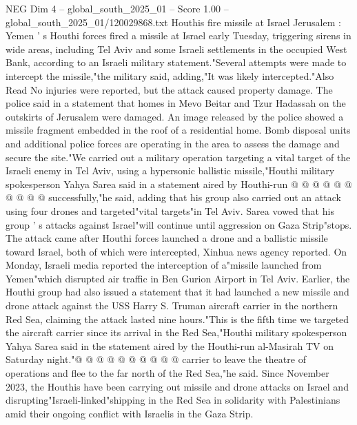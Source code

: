 \begin{textsample}{NEG Dim 4 – global\_south\_2025\_01 – Score 1.00 – global\_south\_2025\_01/120029868.txt}  \label{ex:f4_neg_446}
Houthis fire missile at Israel Jerusalem : Yemen ' s Houthi forces fired a missile at Israel early Tuesday, triggering sirens in wide areas, including Tel Aviv and some Israeli settlements in the occupied West Bank, according to an Israeli military statement."Several attempts were made to intercept the missile,"the military said, adding,"It was likely intercepted."Also Read No injuries were reported, but the attack caused property damage.
The police said in a statement that homes in Mevo Beitar and Tzur Hadassah on the outskirts of Jerusalem were damaged.
An image released by the police showed a missile fragment embedded in the roof of a residential home.
Bomb disposal units and additional police forces are operating in the area to assess the damage and secure the site."We carried out a military operation targeting a vital target of the Israeli enemy in Tel Aviv, using a hypersonic ballistic missile,"Houthi military spokesperson Yahya Sarea said in a statement aired by Houthi-run @ @ @ @ @ @ @ @ @ @ successfully,"he said, adding that his group also carried out an attack using four drones and targeted"vital targets"in Tel Aviv.
Sarea vowed that his group ' s attacks against Israel"will continue until aggression on Gaza Strip"stops.
The attack came after Houthi forces launched a drone and a ballistic missile toward Israel, both of which were intercepted, Xinhua news agency reported.
On Monday, Israeli media reported the interception of a"missile launched from Yemen"which disrupted air traffic in Ben Gurion Airport in Tel Aviv.
Earlier, the Houthi group had also issued a statement that it had launched a new missile and drone attack against the USS Harry S.
Truman aircraft carrier in the northern Red Sea, claiming the attack lasted nine hours."This is the fifth time we targeted the aircraft carrier since its arrival in the Red Sea,"Houthi military spokesperson Yahya Sarea said in the statement aired by the Houthi-run al-Masirah TV on Saturday night."@ @ @ @ @ @ @ @ @ @ carrier to leave the theatre of operations and flee to the far north of the Red Sea,"he said.
Since November 2023, the Houthis have been carrying out missile and drone attacks on Israel and disrupting"Israeli-linked"shipping in the Red Sea in solidarity with Palestinians amid their ongoing conflict with Israelis in the Gaza Strip.

\end{textsample}
